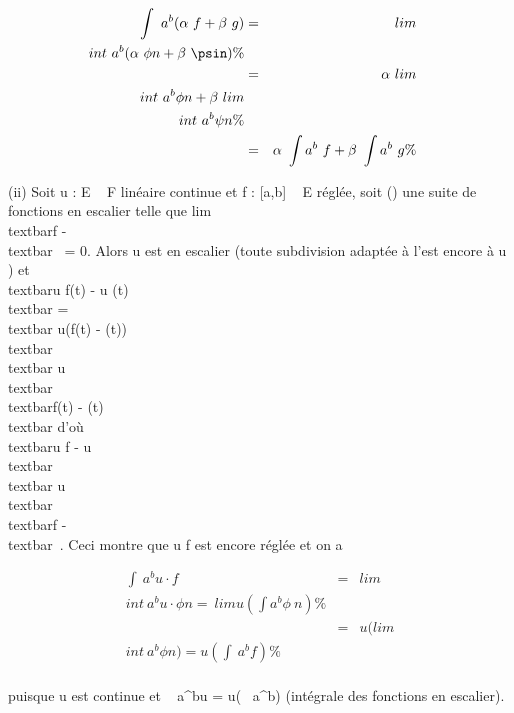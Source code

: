 \begin{align*} \int ~
a^b(\alpha~f + \beta~g)& =&
lim\\int ~
a^b(\alpha~\phi n + \beta~\psin) \%&
\\ & =&
\alpha~lim\\int ~
a^b\phi n +
\beta~lim\\int ~
a^b\psi n\%& \\ &
=& \alpha~\int  a^b~f +
\beta~\int  a^b~g \%&
\\ \end{align*}

(ii) Soit u : E \rightarrow~ F linéaire continue et f : {[}a,b{]} \rightarrow~ E réglée, soit
(\phin) une suite de fonctions en escalier telle que
lim~\\textbar{}f -
\phin\\textbar{}\infty~ = 0. Alors u \cdot \phin est
en escalier (toute subdivision adaptée à \phin l'est encore à u \cdot
\phin) et \\textbar{}u \cdot f(t) - u \cdot
\phin(t)\\textbar{} =\\textbar{}
u(f(t) - \phin(t))\\textbar{}
\leq\\textbar{}
u\\textbar{}\,\\textbar{}f(t)
- \phin(t)\\textbar{} d'où
\\textbar{}u \cdot f - u \cdot
\phin\\textbar{}\infty~ \leq\\textbar{}
u\\textbar{}\,\\textbar{}f
- \phin\\textbar{}\infty~. Ceci montre que u \cdot f est
encore réglée et on a

\begin{align*} \int ~
a^bu \cdot f& =&
lim\\int ~
a^bu \cdot \phi n =\
limu(\int  a^b\phi~
n)\%& \\ & =&
u(lim\\int ~
a^b\phi n) = u(\int ~
a^bf) \%& \\
\end{align*}

puisque u est continue et \int ~
a^bu \cdot \phin = u(\int ~
a^b\phin) (intégrale des fonctions en escalier).

